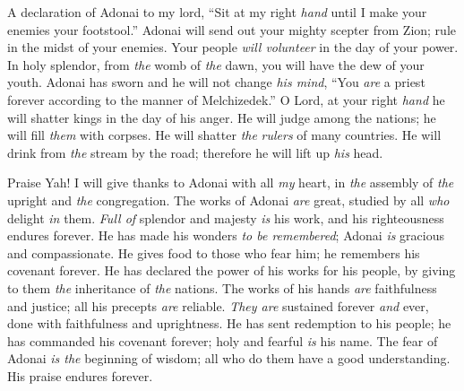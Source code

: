 \begin{biblechapter} %
 A declaration of Adonai to my lord, 
“Sit at my right \textit{hand} 
until I make your enemies your footstool.”
\verse Adonai will send out your mighty scepter from Zion; 
rule in the midst of your enemies.
\verse Your people \textit{will volunteer} in the day of your power. 
In holy splendor, from \textit{the} womb of \textit{the} dawn, 
you will have the dew of your youth.
\verse Adonai has sworn and he will not change \textit{his mind}, 
“You \textit{are} a priest forever 
according to the manner of Melchizedek.”
\verse O Lord, at your right \textit{hand} 
he will shatter kings in the day of his anger.
\verse He will judge among the nations; 
he will fill \textit{them} with corpses. 
He will shatter \textit{the} \textit{rulers} of many countries.
\verse He will drink from \textit{the} stream by the road; 
therefore he will lift up \textit{his} head.
\end{biblechapter}

\begin{biblechapter} %
 Praise Yah! 
I will give thanks to Adonai with all \textit{my} heart, 
in \textit{the} assembly of \textit{the} upright and \textit{the} congregation.
\verse The works of Adonai \textit{are} great, 
studied by all \textit{who} delight \textit{in} them.
\verse \textit{Full of} splendor and majesty \textit{is} his work, 
and his righteousness endures forever.
\verse He has made his wonders \textit{to be remembered}; 
Adonai \textit{is} gracious and compassionate.
\verse He gives food to those who fear him; 
he remembers his covenant forever.
\verse He has declared the power of his works for his people, 
by giving to them \textit{the} inheritance of \textit{the} nations.
\verse The works of his hands \textit{are} faithfulness and justice; 
all his precepts \textit{are} reliable.
\verse \textit{They are} sustained forever \textit{and} ever, 
done with faithfulness and uprightness.
\verse He has sent redemption to his people; 
he has commanded his covenant forever; 
holy and fearful \textit{is} his name.
\verse The fear of Adonai \textit{is the} beginning of wisdom; 
all who do them have a good understanding. 
His praise endures forever.
\end{biblechapter}

